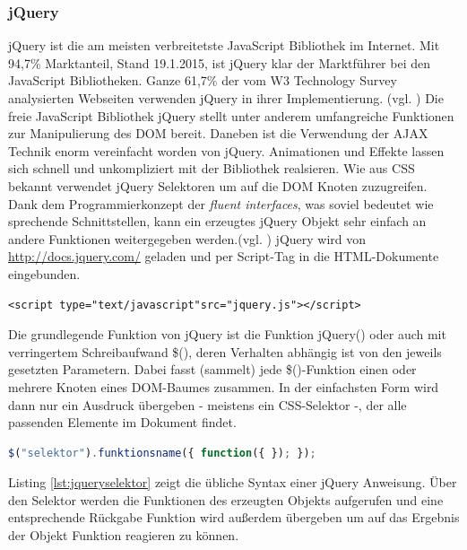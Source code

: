 \subsubsection{jQuery}
jQuery ist die am meisten verbreitetste JavaScript Bibliothek im Internet. Mit 94,7\% Marktanteil, Stand 19.1.2015, ist jQuery klar der Marktführer bei den JavaScript Bibliotheken. Ganze 61,7\% der vom W3 Technology Survey analysierten Webseiten verwenden jQuery in ihrer Implementierung. (vgl. \cite{w3tech}) Die freie JavaScript Bibliothek jQuery stellt unter anderem umfangreiche Funktionen zur Manipulierung des DOM bereit. Daneben ist die Verwendung der AJAX Technik enorm vereinfacht worden von jQuery. Animationen und Effekte lassen sich schnell und unkompliziert mit der Bibliothek realsieren. Wie aus CSS bekannt verwendet jQuery Selektoren um auf die DOM Knoten zuzugreifen. Dank dem Programmierkonzept der \textit{fluent interfaces}, was soviel bedeutet wie sprechende Schnittstellen, kann ein erzeugtes jQuery Objekt sehr einfach an andere Funktionen weitergegeben werden.(vgl. \cite{wikijquery}) \glqq jQuery wird von \url{http://docs.jquery.com/} geladen und per Script-Tag in die HTML-Dokumente eingebunden.

\vspace{1em}
\begin{lstlisting}[language=HTML5, caption=jQuery Einbindung, label=lst:jqueryscript]
<script type="text/javascript"src="jquery.js"></script>
\end{lstlisting}

Die grundlegende Funktion von jQuery ist die Funktion jQuery() oder auch mit verringertem Schreibaufwand \$(), deren Verhalten abhängig ist von den jeweils gesetzten Parametern. Dabei fasst (sammelt) jede \$()-Funktion einen oder mehrere Knoten eines DOM-Baumes zusammen. In der einfachsten Form wird dann nur ein Ausdruck übergeben - meistens ein CSS-Selektor -, der alle passenden Elemente im Dokument findet.\grqq{}\cite{itwissenjquery}

\vspace{1em}
\begin{lstlisting}[language=JavaScript, caption=jQuery Selektor Syntax, label=lst:jqueryselektor]
$("selektor").funktionsname({ function({ }); });
\end{lstlisting}
	
Listing \ref{lst:jqueryselektor} zeigt die übliche Syntax einer jQuery Anweisung. Über den Selektor werden die Funktionen des erzeugten Objekts aufgerufen und eine entsprechende Rückgabe Funktion wird außerdem übergeben um auf das Ergebnis der Objekt Funktion reagieren zu können.

